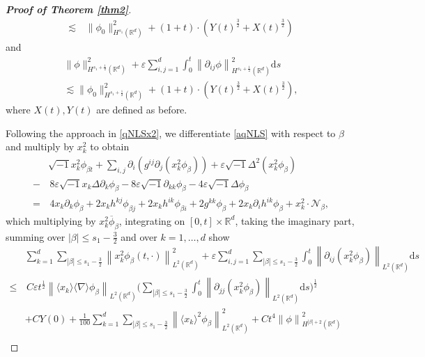 \documentclass[10pt,twoside,a4paper]{article}
\numberwithin{equation}{section}\allowdisplaybreaks
\def\leq{\leqslant}
\begin{document}
\begin{proof}[\textbf{Proof of Theorem \ref{thm2}}]
\begin{align*}
	\lesssim &\,\| \phi_0\|_{H^{s_1 }(\mathbb{R}^d)}^2+ (1+t)\cdot(Y(t)^{\frac 32}+X(t)^{\frac 32} ) \nonumber
\end{align*}
and 
\begin{align} \label{aqener1}
	\|\phi\|_{H^{s_1+\frac12}(\mathbb{R}^{d})}^2+\varepsilon\sum_{i,j=1}^d\int_0^t\left\| \partial_{ij}\phi\right\|_{H^{s_1+\frac12}(\mathbb{R}^d)}^2 \mathrm{d} s\\
	\lesssim 	\|\phi_0\|_{H^{s_1+\frac12}(\mathbb{R}^{d})}^2+  \left(1+t\right) \cdot\left(Y(t)^{\frac 32}+ X(t)^{\frac 32} \right),\nonumber
\end{align}
where $ X(t), Y(t)  $ are defined as before. 

 Following the approach in \eqref{qNLSx2}, we differentiate \eqref{aqNLS} with respect to $\beta$ and multiply by $x_k^2$ to obtain
\begin{align*}   
	&	\sqrt{-1}x_k^2\phi_{\beta t}+\sum_{i,j}\partial_i\left( g^{ij}   \partial_j \left(x_k^2 \phi_{\beta }\right)\right)+	\varepsilon\sqrt{-1}\Delta^2 \left(x_k^2\phi_\beta\right)\\
	-&\,8\varepsilon \sqrt{-1} x_k \Delta\partial_k \phi_\beta -8\varepsilon \sqrt{-1} \partial_{kk} \phi_\beta-4\varepsilon \sqrt{-1}   \Delta\phi_\beta \nonumber\\
	=&\,4 x_k \partial_k  \phi_\beta +2 x_k h^{kj} \phi_{\beta j}+2 x_k h^{ik} \phi_{\beta i}+2 g^{kk} \phi_{\beta } +2 x_k \partial_i h^{ik} \phi_{\beta } +x^2_k \cdot\mathcal{N}_\beta,\nonumber
\end{align*}
which multiplying  by $ x_k^2 \overline{\phi}_\beta $, integrating on $[0,t]\times \mathbb{R}^d $, taking the imaginary part, summing   over $ |\beta| \leq s_1-\frac 32 $ and over $ k =1,\dots,  d $   show
\begin{align} \label{aqenx2}
		& \sum_{k=1}^d\sum_{|\beta| \leq s_1-\frac32}\left\|  x_k^2 \phi_{\beta}\left(t,\cdot\right)\right\|_{L^2(\mathbb{R}^d)}^2 +\varepsilon\sum_{i,j=1}^d\sum_{|\beta| \leq s_1-\frac32}\int_0^t \left\| \partial_{ij}\left( x_k^2
	\phi_\beta\right)\right\|_{L^2(\mathbb{R}^d)}\mathrm{d}s 
	\\
	\leq& \,C\varepsilon t^{\frac 12} \left\| \langle x_k\rangle \langle \nabla \rangle   \phi_{\beta}\right\|_{L^2(\mathbb{R}^d)}\Big(\sum_{|\beta| \leq s_1-\frac32}\int_0^t \left\| \partial_{jj}\left( x_k^2
	\phi_\beta\right)\right\|_{L^2(\mathbb{R}^d)}\mathrm{d}s \Big)^{\frac12}\nonumber\\
	&+C Y(0)+ \frac {1}{100} \sum_{k=1}^d \sum_{|\beta| \leq s_1-\frac32}  \left\|  \langle x_k\rangle^2 \phi_{\beta}\right\|_{L^2(\mathbb{R}^d)}^{2}   +Ct^4 \left\|  \phi\right\|_{H^{|\beta|+2}(\mathbb{R}^d)} ^2 \nonumber\\

\end{align}
\end{proof}
\end{document}
